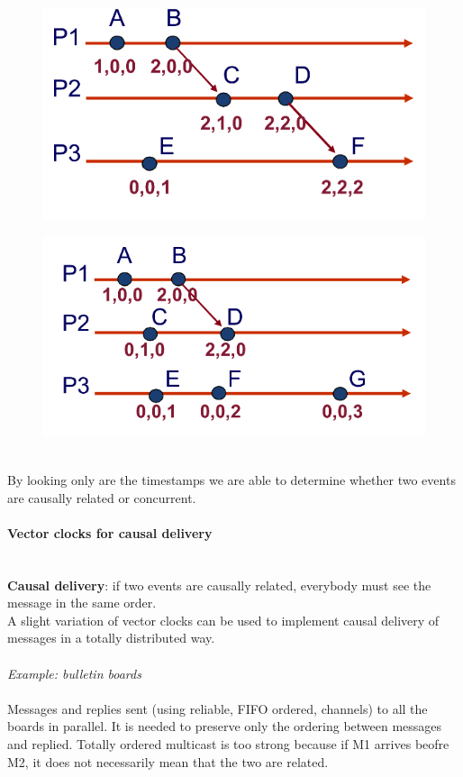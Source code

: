 \documentclass[10pt,a4paper]{article}
\newcommand{\myparagraph}[1]{\paragraph{#1}\mbox{}\\[0.05in]}
\begin{document}
\begin{figure}[h!]
\centering
\begin{minipage}{.5\textwidth}
  \centering
  \includegraphics[width=.7\linewidth]{images/vectorclocks1.png}
  \label{fig:vectorclocks1}
\end{minipage}%
\begin{minipage}{.5\textwidth}
  \centering
  \includegraphics[width=.7\linewidth]{images/vectorclocks2.png}
  \label{fig:vectorclocks2}
\end{minipage}
\end{figure}  \\
By looking only are the timestamps we are able to determine whether two events are causally related or concurrent.
\myparagraph{Vector clocks for causal delivery}
\textbf{Causal delivery}: if two events are causally related, everybody must see the message in the same order. \\
A slight variation of vector clocks can be used to implement causal delivery of messages in a totally distributed way. \\ \\
\textit{Example: bulletin boards} \\ \\
Messages and replies sent (using reliable, FIFO ordered, channels) to all the boards in parallel. It is needed to preserve only the ordering between messages and replied. Totally ordered multicast is too strong because if M1 arrives beofre M2, it does not necessarily mean that the two are related. \\
\end{document}
